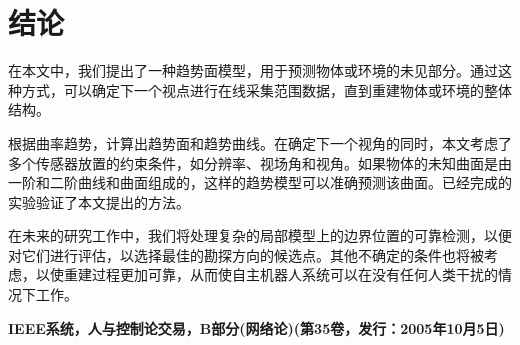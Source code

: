 \documentclass[AutoFakeBold,zihao=-4]{ctexart}
\begin{document}
	\section{结论}
	在本文中，我们提出了一种趋势面模型，用于预测物体或环境的未见部分。通过这种方式，可以确定下一个视点进行在线采集范围数据，直到重建物体或环境的整体结构。
	
	根据曲率趋势，计算出趋势面和趋势曲线。在确定下一个视角的同时，本文考虑了多个传感器放置的约束条件，如分辨率、视场角和视角。如果物体的未知曲面是由一阶和二阶曲线和曲面组成的，这样的趋势模型可以准确预测该曲面。已经完成的实验验证了本文提出的方法。
	
	在未来的研究工作中，我们将处理复杂的局部模型上的边界位置的可靠检测，以便对它们进行评估，以选择最佳的勘探方向的候选点。其他不确定的条件也将被考虑，以使重建过程更加可靠，从而使自主机器人系统可以在没有任何人类干扰的情况下工作。
	
	\nocite{*}
	
	
	\begin{flushright}
		\songti {} \bfseries IEEE系统，人与控制论交易，B部分(网络论)(第35卷，发行：2005年10月5日)
	\end{flushright}
\end{document}

